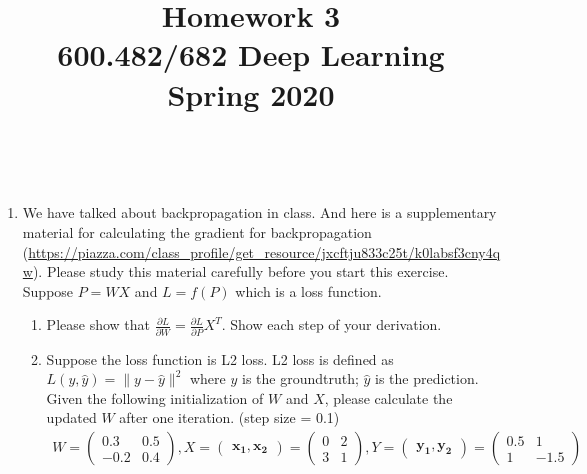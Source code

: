 \documentclass[a4paper]{article}
\title{Homework 3\\
	600.482/682 Deep Learning\\
	Spring 2020}
\begin{document}
	\maketitle
	
	\\
	
	\begin{enumerate}
		\item We have talked about backpropagation in class. And here is a supplementary material for calculating the gradient for backpropagation (\url{https://piazza.com/class_profile/get_resource/jxcftju833c25t/k0labsf3cny4qw}). Please study this material carefully before you start this exercise. Suppose $P = WX$ and $L = f(P)$ which is a loss function. 
		\begin{enumerate}
			\item Please show that $\frac{\partial L}{\partial W}=\frac{\partial L}{\partial P}X^T$. Show each step of your derivation.
			\item Suppose the loss function is L2 loss. L2 loss is defined as $L(y, \hat{y}) = \|y - \hat{y}\|^2$ where $y$ is the groundtruth; $\hat{y}$ is the prediction. Given the following initialization of $W$ and $X$, please calculate the updated $W$ after one iteration. (step size = 0.1)
			\begin{align*}
			W = \begin{pmatrix}
			0.3 & 0.5\\
			-0.2 & 0.4
			\end{pmatrix},
			X = \begin{pmatrix}
			\mathbf{x_1}, \mathbf{x_2}
			\end{pmatrix} =
			\begin{pmatrix}
			0 & 2\\
			3 & 1
			\end{pmatrix},
			Y = \begin{pmatrix}
			\mathbf{y_1}, \mathbf{y_2}
			\end{pmatrix} = 
			\begin{pmatrix}
			0.5 & 1\\
			1 & -1.5
			\end{pmatrix}
			\end{align*}
		\end{enumerate}
		


\end{enumerate}
\end{document}
